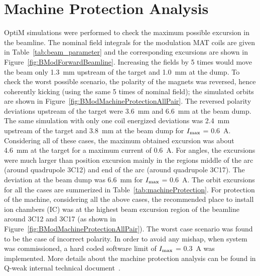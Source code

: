 \section{Machine Protection Analysis}
\label{Machine Protection Analysis}
OptiM simulations were performed to check the maximum possible excursion in the beamline. The nominal field integrals for the modulation MAT coils are given in Table~\ref{tab:beam_parameter} and the corresponding excursions are shown in Figure~\ref{fig:BModForwardBeamline}. 
Increasing the fields by 5 times would move the beam only 1.3~mm upstream of the target and 1.0~mm at the dump.
To check the worst possible scenario, the polarity of the magnets was reversed, hence coherently kicking (using the same 5 times of nominal field); the simulated orbits are shown in Figure~\ref{fig:BModMachineProtectionAllPair}. The reversed polarity deviations upstream of the target were 3.6~mm and 6.6~mm at the beam dump. The same simulation with only one coil energized deviations was 2.4~mm upstream of the target and 3.8~mm at the beam dump for $I_{\rm max}$ = 0.6~A.
Considering all of these cases, the maximum obtained excursion was about 4.6~mm at the target for a maximum current of 0.6~A. For angles, the excursions were much larger than position excursion mainly in the regions middle of the arc (around quadrupole 3C12) and end of the arc (around quadrupole 3C17). The deviation at the beam dump was 6.6~mm for $I_{\rm max}$ = 0.6~A. The orbit excursions for all the cases are summerized in Table~\ref{tab:machineProtection}.
For protection of the machine, considering all the above cases, the recommended place to install ion chambers (IC) was at the highest beam excursion region of the beamline around 3C12 and 3C17 (as shown in Figure~\ref{fig:BModMachineProtectionAllPair}). 
The worst case scenario was found to be the case of incorrect polarity. 
In order to avoid any mishap, when system was commissioned, a hard coded software limit of $I_{\rm max}$ = 0.3~A was implemented. 
More details about the machine protection analysis can be found in Q-weak internal technical document~\cite{nur_bm_machine_protection}.


